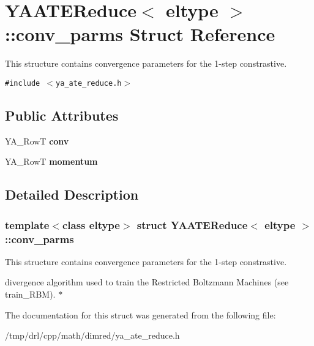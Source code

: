 \hypertarget{struct_y_a_a_t_e_reduce_1_1conv__parms}{
\section{YAATEReduce$<$ eltype $>$::conv\_\-parms Struct Reference}
\label{struct_y_a_a_t_e_reduce_1_1conv__parms}
}
This structure contains convergence parameters for the 1-step constrastive.  


{\tt \#include $<$ya\_\-ate\_\-reduce.h$>$}

\subsection*{Public Attributes}
\begin{CompactItemize}
\item 
\hypertarget{struct_y_a_a_t_e_reduce_1_1conv__parms_o0}{
YA\_\-Row\-T {\bf conv}}
\label{struct_y_a_a_t_e_reduce_1_1conv__parms_o0}

\item 
\hypertarget{struct_y_a_a_t_e_reduce_1_1conv__parms_o1}{
YA\_\-Row\-T {\bf momentum}}
\label{struct_y_a_a_t_e_reduce_1_1conv__parms_o1}

\end{CompactItemize}


\subsection{Detailed Description}
\subsubsection*{template$<$class eltype$>$ struct YAATEReduce$<$ eltype $>$::conv\_\-parms}

This structure contains convergence parameters for the 1-step constrastive. 

divergence algorithm used to train the Restricted Boltzmann Machines (see train\_\-RBM). $\ast$ 



The documentation for this struct was generated from the following file:\begin{CompactItemize}
\item 
/tmp/drl/cpp/math/dimred/ya\_\-ate\_\-reduce.h\end{CompactItemize}
